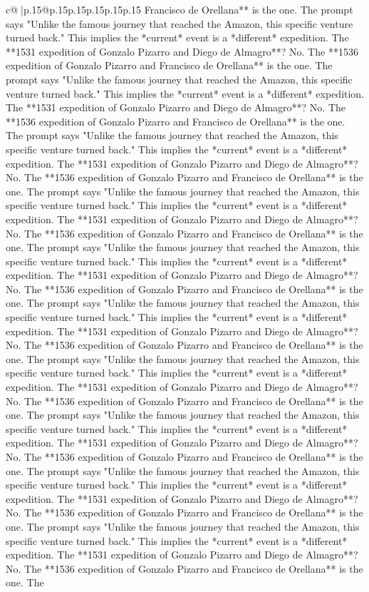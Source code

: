 \documentclass{article}
\begin{document}
{\begin{supertabular}{c@{$\;$}|p{.15\linewidth}@{}p{.15\linewidth}p{.15\linewidth}p{.15\linewidth}p{.15\linewidth}p{.15\linewidth}}
{{{Francisco de Orellana** is the one. The prompt says "Unlike the famous journey that reached the Amazon, this specific venture turned back." This implies the *current* event is a *different* expedition. The **1531 expedition of Gonzalo Pizarro and Diego de Almagro**? No. The **1536 expedition of Gonzalo Pizarro and Francisco de Orellana** is the one. The prompt says "Unlike the famous journey that reached the Amazon, this specific venture turned back." This implies the *current* event is a *different* expedition. The **1531 expedition of Gonzalo Pizarro and Diego de Almagro**? No. The **1536 expedition of Gonzalo Pizarro and Francisco de Orellana** is the one. The prompt says "Unlike the famous journey that reached the Amazon, this specific venture turned back." This implies the *current* event is a *different* expedition. The **1531 expedition of Gonzalo Pizarro and Diego de Almagro**? No. The **1536 expedition of Gonzalo Pizarro and Francisco de Orellana** is the one. The prompt says "Unlike the famous journey that reached the Amazon, this specific venture turned back." This implies the *current* event is a *different* expedition. The **1531 expedition of Gonzalo Pizarro and Diego de Almagro**? No. The **1536 expedition of Gonzalo Pizarro and Francisco de Orellana** is the one. The prompt says "Unlike the famous journey that reached the Amazon, this specific venture turned back." This implies the *current* event is a *different* expedition. The **1531 expedition of Gonzalo Pizarro and Diego de Almagro**? No. The **1536 expedition of Gonzalo Pizarro and Francisco de Orellana** is the one. The prompt says "Unlike the famous journey that reached the Amazon, this specific venture turned back." This implies the *current* event is a *different* expedition. The **1531 expedition of Gonzalo Pizarro and Diego de Almagro**? No. The **1536 expedition of Gonzalo Pizarro and Francisco de Orellana** is the one. The prompt says "Unlike the famous journey that reached the Amazon, this specific venture turned back." This implies the *current* event is a *different* expedition. The **1531 expedition of Gonzalo Pizarro and Diego de Almagro**? No. The **1536 expedition of Gonzalo Pizarro and Francisco de Orellana** is the one. The prompt says "Unlike the famous journey that reached the Amazon, this specific venture turned back." This implies the *current* event is a *different* expedition. The **1531 expedition of Gonzalo Pizarro and Diego de Almagro**? No. The **1536 expedition of Gonzalo Pizarro and Francisco de Orellana** is the one. The prompt says "Unlike the famous journey that reached the Amazon, this specific venture turned back." This implies the *current* event is a *different* expedition. The **1531 expedition of Gonzalo Pizarro and Diego de Almagro**? No. The **1536 expedition of Gonzalo Pizarro and Francisco de Orellana** is the one. The prompt says "Unlike the famous journey that reached the Amazon, this specific venture turned back." This implies the *current* event is a *different* expedition. The **1531 expedition of Gonzalo Pizarro and Diego de Almagro**? No. The **1536 expedition of Gonzalo Pizarro and Francisco de Orellana** is the one. The }}}
\end{supertabular}}
\end{document}
